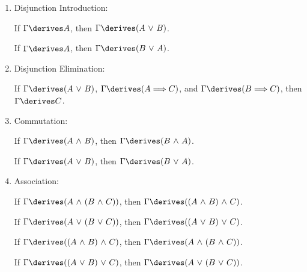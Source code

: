 \begin{enumerate}[topsep=2pt,itemsep=10pt,label=\textup{\texttt{(\arabic*)}}]
        If \( \Gamma \derives \mleft( A \,\,{\land}\,\, B \mright) \), then \( \Gamma \derives B \).

    \item Disjunction Introduction:  \label{rule-of-inference:disjunction-introduction}

        If \( \Gamma \derives A \), then \( \Gamma \derives \mleft( A \,\,{\lor}\,\, B \mright) \).

        If \( \Gamma \derives A \), then \( \Gamma \derives \mleft( B \,\,{\lor}\,\, A \mright) \).

    \item Disjunction Elimination:  \label{rule-of-inference:disjunction-elimination}

        If \( \Gamma \derives \mleft( A \,\,{\lor}\,\, B \mright) \), \( \Gamma \derives \mleft( A {\implies} C \mright) \),
        and \( \Gamma \derives \mleft( B {\implies} C \mright) \), then \( \Gamma \derives C \).

    \item Commutation:  \label{rule-of-inference:commutation}

        If \( \Gamma \derives \mleft( A \,\,{\land}\,\, B \mright) \), then \( \Gamma \derives \mleft( B \,\,{\land}\,\, A \mright) \).

        \noindent
        If \( \Gamma \derives \mleft( A \,\,{\lor}\,\, B \mright) \), then \( \Gamma \derives \mleft( B \,\,{\lor}\,\, A \mright) \).

    \item Association:  \label{rule-of-inference:association}

        If \( \Gamma \derives \mleft( A \,\,{\land}\,\, \mleft( B \,\,{\land}\,\, C \mright) \mright) \), then
        \( \Gamma \derives \mleft( \mleft( A \,\,{\land}\,\, B \mright) \,\,{\land}\,\, C \mright) \).

        \noindent
        If \( \Gamma \derives \mleft( A \,\,{\lor}\,\, \mleft( B \,\,{\lor}\,\, C \mright) \mright) \), then
        \( \Gamma \derives \mleft( \mleft( A \,\,{\lor}\,\, B \mright) \,\,{\lor}\,\, C \mright) \).

        \noindent
        If \( \Gamma \derives \mleft( \mleft( A \,\,{\land}\,\, B \mright) \,\,{\land}\,\, C \mright) \), then
        \( \Gamma \derives \mleft( A \,\,{\land}\,\, \mleft( B \,\,{\land}\,\, C \mright) \mright) \).

        \noindent
        If \( \Gamma \derives \mleft( \mleft( A \,\,{\lor}\,\, B \mright) \,\,{\lor}\,\, C \mright) \), then
        \( \Gamma \derives \mleft( A \,\,{\lor}\,\, \mleft( B \,\,{\lor}\,\, C \mright) \mright) \).


\end{enumerate}
